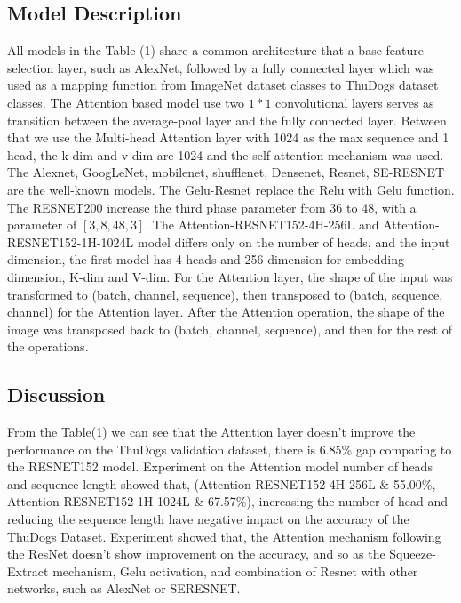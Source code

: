 \documentclass[runningheads]{llncs}
\begin{document}
\subsection{Model Description}

All models in the Table (1) share a common architecture that a base feature selection layer, such as AlexNet, followed by a fully connected layer which was used as a mapping function from ImageNet dataset classes to ThuDogs dataset classes.
The Attention based model use two $1*1$ convolutional layers serves as transition between the average-pool layer and the fully connected layer.
Between that we use the Multi-head Attention layer with 1024 as the max sequence and 1 head, the k-dim and v-dim are 1024 and the self attention mechanism was used.
The Alexnet, GoogLeNet, mobilenet, shufflenet, Densenet, Resnet, SE-RESNET are the well-known models. The Gelu-Resnet replace the Relu with Gelu function.
The RESNET200 increase the third phase parameter from 36 to 48, with a parameter of $[3,8,48,3]$.
The Attention-RESNET152-4H-256L and Attention-RESNET152-1H-1024L model differs only on the number of heads, and the input dimension, the first model has 4 heads and 256 dimension for embedding dimension, K-dim and V-dim.
For the Attention layer, the shape of the input was transformed to (batch, channel, sequence), then transposed to (batch, sequence, channel) for the Attention layer.
After the Attention operation, the shape of the image was transposed back to (batch, channel, sequence), and then for the rest of the operations.

\subsection{Discussion}

From the Table(1) we can see that the Attention layer doesn't improve the performance on the ThuDogs validation dataset, there is 6.85\% gap comparing to the RESNET152 model.
Experiment on the Attention model number of heads and sequence length showed that, (Attention-RESNET152-4H-256L \&  	55.00\%, Attention-RESNET152-1H-1024L \&  	67.57\%),
increasing the number of head and reducing the sequence length have negative impact on the accuracy of the ThuDogs Dataset.
Experiment showed that, the Attention mechanism following the ResNet doesn't show improvement on the accuracy, and so as the Squeeze-Extract mechanism, Gelu activation, and combination of Resnet with other networks, such as AlexNet or SERESNET.

\end{document}

